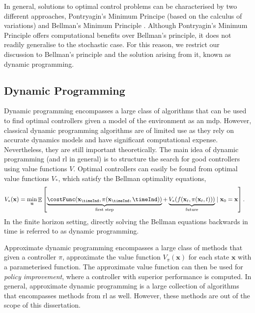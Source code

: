 \documentclass{mimosis-class/mimosis}
\numberwithin{equation}{chapter}
\DeclareMathOperator{\E}{\mathbb{E}}
\newcommand{\state}{\ensuremath{\mathbf{x}}}
\newcommand{\control}{\ensuremath{\mathbf{u}}}
\begin{document}
In general, solutions to optimal control problems can be characterised by two different approaches,
Pontryagin's Minimum Principe \citep{pontryagin1987mathematical} (based on the calculus of variations)
and Bellman's Minimum Principle \citep{bellmanDynamic1956}.
Although Pontryagin's Minimum Principle offers computational benefits over Bellman's principle, it does not
readily generalise to the stochastic case.
For this reason, we restrict our discussion to Bellman's principle and the solution arising from it, known as
dynamic programming.

\subsection{Dynamic Programming}
\label{sec:org1e4c348}
Dynamic programming \citep{bellmanDynamic1956} encompasses a large class of algorithms that can be
used to find optimal controllers given a model of the environment as an \acrshort{mdp}.
However, classical dynamic programming algorithms are of limited use as they rely on
accurate dynamics models and have significant computational expense.
Nevertheless, they are still important theoretically.
The main idea of dynamic programming (and \acrshort{rl} in general) is to structure the search for good controllers using
value functions \(V\).
Optimal controllers can easily be found from optimal value functions \(V_*\), which satisfy the Bellman
optimality equations,
\begin{align} \label{eq-bellman}
V_*(\state) = \min_{\control} &\E \left[ \underbrace{\costFunc(\state_{\timeInd}, \pi(\state_{\timeInd}, \timeInd))}_{\text{first step}}
+ \underbrace{V_*(f(\state_{t}, \pi(\state_{t}, t)))}_{\text{future}}
\mid \state_0=\state \right].
\end{align}
In the finite horizon setting, directly solving the Bellman equations backwards in time is referred to
as dynamic programming.

Approximate dynamic programming encompasses a large class of methods that given a controller \(\pi\),
approximate the value function \(V_{\pi}(\state)\) for each state \(\state\) with a parameterised function.
The approximate value function can then be used for \emph{policy improvement}, where a controller
with superior performance is computed.
In general, approximate dynamic programming is a large collection of algorithms that encompasses methods from
\acrshort{rl} as well.
However, these methods are out of the scope of this dissertation.
\end{document}
